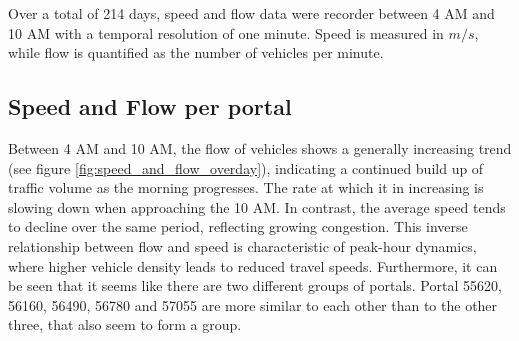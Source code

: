 	Over a total of 214 days, speed and flow data were recorder between 4 AM and 10 AM with a temporal resolution of one minute.
	Speed is measured in $\si{m/s}$, while flow is quantified as the number of vehicles per minute.
	\subsection{Speed and Flow per portal}
	Between 4 AM and 10 AM, the flow of vehicles shows a generally increasing trend (see figure \ref{fig:speed_and_flow_overday}), indicating a continued build up of traffic volume as the morning progresses. The rate at which it in increasing is slowing down when approaching the 10 AM. In contrast, the average speed tends to decline over the same period, reflecting growing congestion.
	This inverse relationship between flow and speed is characteristic of peak-hour dynamics, where higher vehicle density leads to reduced travel speeds.
	Furthermore, it can be seen that it seems like there are two different groups of portals. Portal 55620, 56160, 56490, 56780 and 57055 are more similar to each other than to the other three, that also seem to form a group. 
